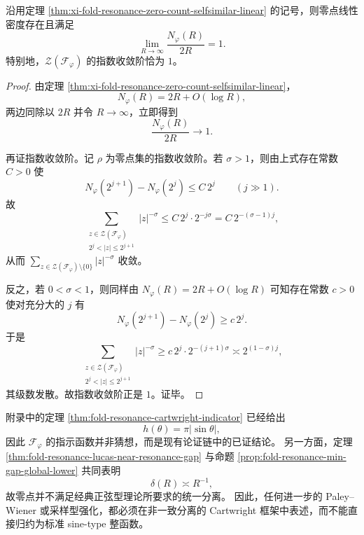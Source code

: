 \begin{corollary}\label{cor:xi-fold-resonance-zero-density-exponent-one}
沿用定理 \ref{thm:xi-fold-resonance-zero-count-selfsimilar-linear} 的记号，则零点线性密度存在且满足
\[
\boxed{\;
\lim_{R\to\infty}\frac{N_\varphi(R)}{2R}=1.\;}
\]
特别地，\(\mathcal Z(\mathcal F_\varphi)\) 的指数收敛阶恰为 \(1\)。
\end{corollary}
\begin{proof}
由定理 \ref{thm:xi-fold-resonance-zero-count-selfsimilar-linear}，
\[
N_\varphi(R)=2R+O(\log R),
\]
两边同除以 \(2R\) 并令 \(R\to\infty\)，立即得到
\[
\frac{N_\varphi(R)}{2R}\to 1.
\]

再证指数收敛阶。记 \(\rho\) 为零点集的指数收敛阶。若 \(\sigma>1\)，则由上式存在常数 \(C>0\) 使
\[
N_\varphi(2^{j+1})-N_\varphi(2^j)\le C\,2^j
\qquad(j\gg 1).
\]
故
\[
\sum_{\substack{z\in\mathcal Z(\mathcal F_\varphi)\\ 2^j<|z|\le 2^{j+1}}}|z|^{-\sigma}
\le
C\,2^j\cdot 2^{-j\sigma}
=
C\,2^{-(\sigma-1)j},
\]
从而 \(\sum_{z\in\mathcal Z(\mathcal F_\varphi)\setminus\{0\}}|z|^{-\sigma}\) 收敛。

反之，若 \(0<\sigma<1\)，则同样由 \(N_\varphi(R)=2R+O(\log R)\) 可知存在常数 \(c>0\) 使对充分大的 \(j\) 有
\[
N_\varphi(2^{j+1})-N_\varphi(2^j)\ge c\,2^j.
\]
于是
\[
\sum_{\substack{z\in\mathcal Z(\mathcal F_\varphi)\\ 2^j<|z|\le 2^{j+1}}}|z|^{-\sigma}
\ge
c\,2^j\cdot 2^{-(j+1)\sigma}
\asymp
2^{(1-\sigma)j},
\]
其级数发散。故指数收敛阶正是 \(1\)。证毕。
\end{proof}

\begin{remark}[正弦型强化的障碍]\label{rem:xi-fold-resonance-sine-type-obstruction}
附录中的定理 \ref{thm:fold-resonance-cartwright-indicator} 已经给出
\[
h(\theta)=\pi|\sin\theta|,
\]
因此 \(\mathcal F_\varphi\) 的指示函数并非猜想，而是现有论证链中的已证结论。
另一方面，定理 \ref{thm:fold-resonance-lucas-near-resonance-gap} 与命题 \ref{prop:fold-resonance-min-gap-global-lower} 共同表明
\[
\delta(R)\asymp R^{-1},
\]
故零点并不满足经典正弦型理论所要求的统一分离。
因此，任何进一步的 Paley--Wiener 或采样型强化，都必须在非一致分离的 Cartwright 框架中表述，而不能直接归约为标准 sine-type 整函数。
\end{remark}

